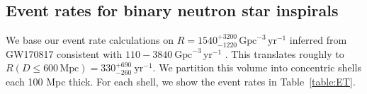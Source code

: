 \documentclass{aa}
\begin{document}
\subsection{Event rates for binary neutron star inspirals}
We base our event rate calculations on $R=1540^{+3200}_{-1220}\,\text{Gpc}^{-3}\,\text{yr}^{-1}$ inferred from GW170817 \citep{GW170817} consistent with $110 - 3840~\mathrm{Gpc}^{-3}\,\text{yr}^{-1}$ \citep{LIGOScientific:2018mvr}. %
This translates roughly to $R(D\le 600\,\text{Mpc})=330^{+690}_{-260}~\mathrm{yr}^{-1}$. %
We partition this volume into concentric shells each 100 Mpc thick. For each shell, we show the event rates in Table~\ref{table:ET}. %
%
%
%
%
\end{document}
